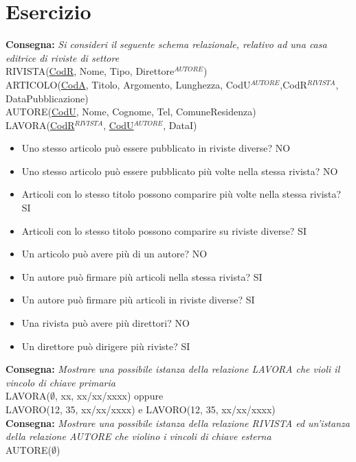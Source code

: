 \documentclass[12pt]{article}
\begin{document}
\section{Esercizio}
\textbf{Consegna: }\textit{Si consideri il seguente schema relazionale, relativo ad una casa editrice di riviste di settore}
\\ RIVISTA(\uline{CodR}, Nome, Tipo, Direttore$^{AUTORE}$)
\\ ARTICOLO(\uline{CodA}, Titolo, Argomento, Lunghezza, CodU$^{AUTORE}$,CodR$^{RIVISTA}$, DataPubblicazione)
\\ AUTORE(\uline{CodU}, Nome, Cognome, Tel, ComuneResidenza)
\\ LAVORA(\uline{CodR$^{RIVISTA}$}, \uline{CodU$^{AUTORE}$}, DataI)
\begin{itemize}
    \item Uno stesso articolo può essere pubblicato in riviste diverse? NO
    \item Uno stesso articolo può essere pubblicato più volte nella stessa rivista? NO
    \item Articoli con lo stesso titolo possono comparire più volte nella stessa rivista? SI
    \item Articoli con lo stesso titolo possono comparire su riviste diverse? SI
    \item Un articolo può avere più di un autore? NO
    \item Un autore può firmare più articoli nella stessa rivista? SI
    \item Un autore può firmare più articoli in riviste diverse? SI
    \item Una rivista può avere più direttori? NO
    \item Un direttore può dirigere più riviste? SI
\end{itemize}
\textbf{Consegna: }\textit{Mostrare una possibile istanza della relazione LAVORA che violi il vincolo di chiave primaria}
\\ LAVORA($\emptyset$, xx, xx/xx/xxxx) oppure\\ LAVORO(12, 35, xx/xx/xxxx) e LAVORO(12, 35, xx/xx/xxxx)
\\\textbf{Consegna: }\textit{Mostrare una possibile istanza della relazione RIVISTA ed un'istanza della relazione AUTORE che violino i vincoli di chiave esterna}
\\ AUTORE($\emptyset$)
\end{document}
